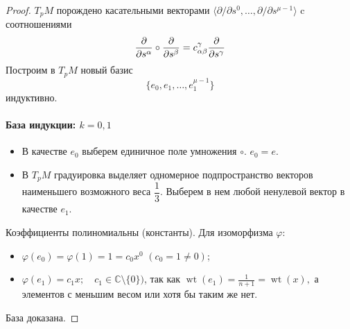 \begin{proof}
	\(T_pM\) порождено касательными векторами \(\langle \partial/\partial s^0, \dots, \partial/\partial s^{\mu-1} \rangle\) c соотношениями \[\tang[s^\alpha] \circ \tang[s^\beta] = c^\gamma_{\alpha\beta}\tang[s^{\gamma}]\]
	Построим в \(T_pM\) новый базис \[\{e_0, e_1, \dots, e_1^{\mu-1}\}\] индуктивно. \par
	\paragraph{База индукции: $k=0,1$}
	\begin{itemize}
		\item В качестве \(e_0\) выберем единичное поле умножения \(\circ\). \(e_0 = e\).
		\item В \(T_pM\) градуировка выделяет одномерное подпространство векторов наименьшего возможного веса \(\dfrac{1}{3}\). Выберем в нем любой ненулевой вектор в качестве \(e_1\). 
		
	\end{itemize}
	Коэффициенты полиномиальны (константы).
	Для изоморфизма $\varphi$:
	\begin{itemize}
		\item $\varphi(e_0)=\varphi(1)=1=c_0x^0$ $(c_0=1\neq 0)$;
		\item $\varphi(e_1)=c_1x; \quad c_1\in \mathbb{C}\setminus\{0\})$, так как
		\(\operatorname{wt}(e_1)=\frac{1}{n+1}=\operatorname{wt}(x),\)
		а элементов с меньшим весом или хотя бы таким же нет.
	\end{itemize}
	База доказана.

\end{proof}
